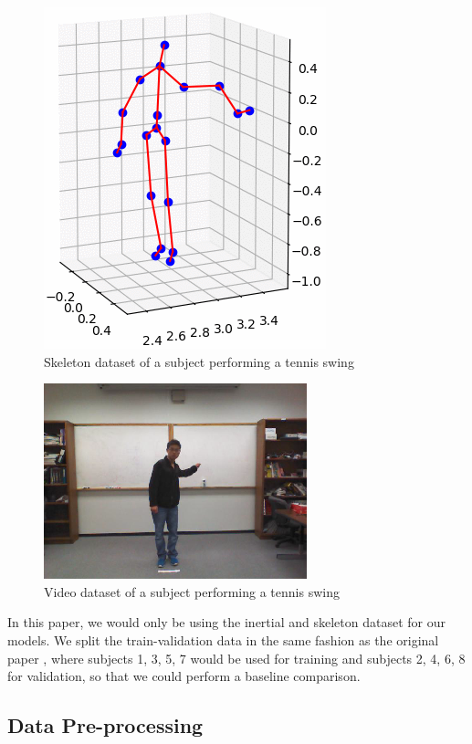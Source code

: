 \documentclass[conference]{IEEEtran}
\begin{document}
\begin{figure}[H]
\begin{center}
\includegraphics[scale=0.3]{skeleton_tennis_swing.png}
\end{center}
\caption{\label{fig:tennis_swing_skel} Skeleton dataset of a subject performing a tennis swing}
\end{figure}
\begin{figure}[H]
\begin{center}
\includegraphics[scale=0.4]{tennis_swing.png}
\end{center}
\caption{\label{fig:tennis_swing_vid} Video dataset of a subject performing a tennis swing}
\end{figure}
In this paper, we would only be using the inertial and skeleton dataset for our models. We split the train-validation data in the same fashion as the original paper \cite{UTD-MHAD}, where subjects 1, 3, 5, 7 would be used for training and subjects 2, 4, 6, 8 for validation, so that we could perform a baseline comparison.  
\subsection{Data Pre-processing}
\end{document}
